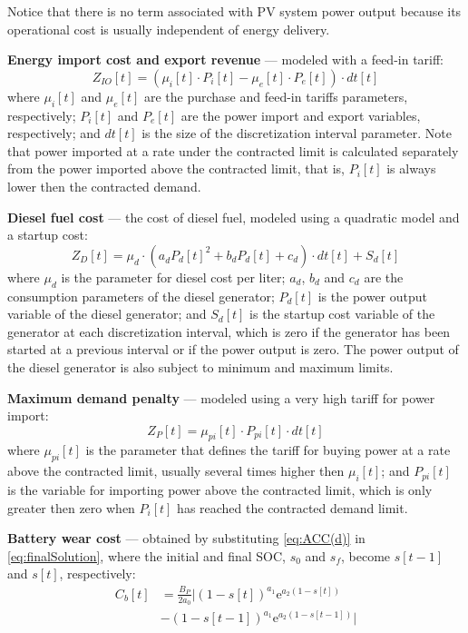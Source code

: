\documentclass{ieeeaccess}
\begin{document}
    Notice that there is no term associated with PV system power output because its operational cost is usually independent of energy delivery.

    \textbf{Energy import cost and export revenue} --- modeled with a feed-in tariff:
    \begin{equation}
        Z_{IO}[t] = \left( \mu_i[t] \cdot P_i[t] - \mu_e[t] \cdot P_e[t] \right) \cdot dt[t]
    \end{equation}
    where $\mu_i[t]$ and $\mu_e[t]$ are the purchase and feed-in tariffs parameters, respectively; $P_{i}[t]$ and $P_{e}[t]$ are the power import and export variables, respectively; and $dt[t]$ is the size of the discretization interval parameter. Note that power imported at a rate under the contracted limit is calculated separately from the power imported above the contracted limit, that is, $P_i[t]$ is always lower then the contracted demand.

    \textbf{Diesel fuel cost} --- the cost of diesel fuel, modeled using a quadratic model and a startup cost:
    \begin{equation}
        Z_D[t] = \mu_d \cdot (a^{}_d P_d[t]^{2} + b_dP_d[t] + c_d) \cdot dt[t] + S_d[t]
    \end{equation}
    where $\mu_d$ is the parameter for diesel cost per liter; $a_d$, $b_d$ and $c_d$ are the consumption parameters of the diesel generator; $P_d[t]$ is the power output variable of the diesel generator; and $S_d[t]$ is the startup cost variable of the generator at each discretization interval, which is zero if the generator has been started at a previous interval or if the power output is zero. The power output of the diesel generator is also subject to minimum and maximum limits.

    \textbf{Maximum demand penalty} --- modeled using a very high tariff for power import:
    \begin{equation}
        Z_P[t] = \mu_{pi}[t] \cdot P_{pi}[t] \cdot dt[t]
    \end{equation}
    where $\mu_{pi}[t]$ is the parameter that defines the tariff for buying power at a rate above the contracted limit, usually several times higher then $\mu_i[t]$; and $P_{pi}[t]$ is the variable for importing power above the contracted limit, which is only greater then zero when $P_i[t]$ has reached the contracted demand limit.

    \textbf{Battery wear cost} --- obtained by substituting \eqref{eq:ACC(d)} in \eqref{eq:finalSolution}, where the initial and final SOC, $s_0$ and $s_f$, become $s[t-1]$ and $s[t]$, respectively:
    \begin{equation}
        \begin{aligned}
            C_b[t] & = \frac{B_P}{2a_0} \Bigg|(1-s[t])^{a_1}\mathrm{e}^{a_2(1-s[t])} \\
            & - (1-s[t-1])^{a_1}\mathrm{e}^{a_2(1-s[t-1])} \Bigg|
        \end{aligned}
    \end{equation}
\end{document}
